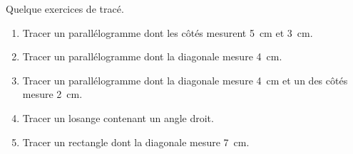 
\begin{exercice}\label{exo2smath-0170}

    Quelque exercices de tracé.
    \begin{enumerate}
        \item
            Tracer un parallélogramme dont les côtés mesurent \SI{5}{\centi\meter} et \SI{3}{\centi\meter}.
        \item
            Tracer un parallélogramme dont la diagonale mesure \SI{4}{\centi\meter}.
        \item
            Tracer un parallélogramme dont la diagonale mesure \SI{4}{\centi\meter} et un des côtés mesure  \SI{2}{\centi\meter}.
        \item
            Tracer un losange contenant un angle droit.
        \item
            Tracer un rectangle dont la diagonale mesure \SI{7}{\centi\meter}.
    \end{enumerate}

\end{exercice}
